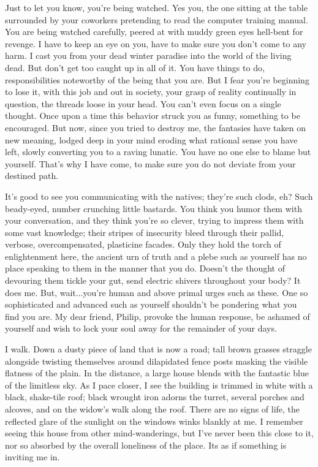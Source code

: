 Just to let you know, you're being watched. Yes you, the one sitting at
the table surrounded by your coworkers pretending to read the computer
training manual. You are being watched carefully, peered at with muddy
green eyes hell-bent for revenge. I have to keep an eye on you, have to
make sure you don't come to any harm. I cast you from your dead winter
paradise into the world of the living dead. But don't get too caught up
in all of it. You have things to do, responsibilities noteworthy of the
being that you are. But I fear you're beginning to lose it, with this
job and out in society, your grasp of reality continually in question,
the threads loose in your head. You can't even focus on a single
thought. Once upon a time this behavior struck you as funny, something
to be encouraged. But now, since you tried to destroy me, the fantasies
have taken on new meaning, lodged deep in your mind eroding what
rational sense you have left, slowly converting you to a raving lunatic.
You have no one else to blame but yourself. That's why I have come, to
make sure you do not deviate from your destined path.

It's good to see you communicating with the natives; they're such clods,
eh? Such beady-eyed, number crunching little bastards. You think you
humor them with your conversation, and they think you're so clever,
trying to impress them with some vast knowledge; their stripes of
insecurity bleed through their pallid, verbose, overcompensated,
plasticine facades. Only they hold the torch of enlightenment here, the
ancient urn of truth and a plebe such as yourself has no place speaking
to them in the manner that you do. Doesn't the thought of devouring them
tickle your gut, send electric shivers throughout your body? It does me.
But, wait...you're human and above primal urges such as these. One so
sophisticated and advanced such as yourself shouldn't be pondering what
you find you are. My dear friend, Philip, provoke the human response, be
ashamed of yourself and wish to lock your soul away for the remainder of
your days.

I walk. Down a dusty piece of land that is now a road; tall brown
grasses straggle alongside twisting themselves around dilapidated fence
posts masking the visible flatness of the plain. In the distance, a
large house blends with the fantastic blue of the limitless sky. As I
pace closer, I see the building is trimmed in white with a black,
shake-tile roof; black wrought iron adorns the turret, several porches
and alcoves, and on the widow's walk along the roof. There are no signs
of life, the reflected glare of the sunlight on the windows winks
blankly at me. I remember seeing this house from other mind-wanderings,
but I've never been this close to it, nor so absorbed by the overall
loneliness of the place. It\textquotesingle s as if something is
inviting me in.

